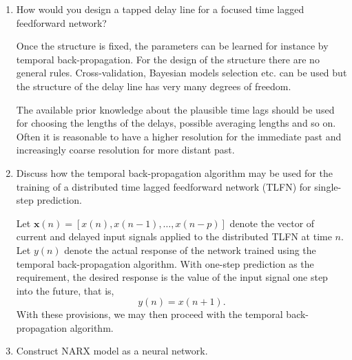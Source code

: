 \begin{enumerate}
\begin{solution}
  \end{solution}
  
\item How would you design a tapped delay line for a focused time
  lagged feedforward network?


  \begin{solution}

    Once the structure is fixed, the parameters can be learned for
    instance by temporal back-propagation.  For the design of the structure there are no
    general rules.  Cross-validation, Bayesian models selection etc.
    can be used but the structure of the delay line has very many
    degrees of freedom.

    The available prior knowledge about the plausible time lags should
    be used for choosing the lengths of the delays, possible averaging
    lengths and so on.  Often it is reasonable to have a higher
    resolution for the immediate past and increasingly coarse
    resolution for more distant past.


  \end{solution}
  
\item Discuss how the temporal back-propagation algorithm may be used for the
  training of a distributed time lagged feedforward network (TLFN) for single-step prediction.

  \begin{solution}

    Let $\mathbf{x}(n)=[x(n), x(n-1), \ldots ,x(n-p)]$ denote the
    vector of current and delayed input signals applied to the
    distributed TLFN at time $n$. Let $y(n)$ denote the actual
    response of the network trained using the temporal
    back-propagation algorithm. With one-step prediction as the
    requirement, the desired response is the value of the input signal
    one step into the future, that is,
    \begin{equation*}
      y(n) = x(n+1).
    \end{equation*}
    With these provisions, we may then proceed with the temporal
    back-propagation algorithm.

  \end{solution}
  


\item Construct NARX model as a neural network.



\end{enumerate}

